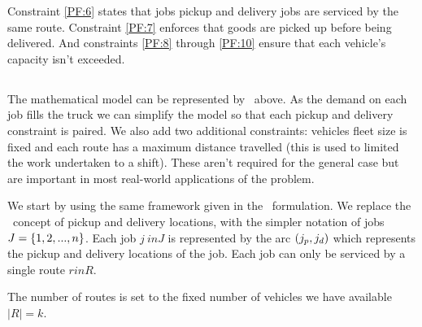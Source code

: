 Constraint \eqref{PF:6} states that jobs pickup and delivery jobs are serviced by the same route. Constraint \eqref{PF:7} enforces that goods are picked up before being delivered. And constraints \eqref{PF:8} through \eqref{PF:10} ensure that each vehicle's capacity isn't exceeded. 

\subsection{\PDPFTL}

The mathematical model can be represented by \PDP\ above. As the demand on each job fills the truck we can simplify the model so that each pickup and delivery constraint is paired. We also add two additional constraints: vehicles fleet size is fixed and each route has a maximum distance travelled (this is used to limited the work undertaken to a shift). These aren't required for the general case but are important in most real-world applications of the problem. 

We start by using the same framework given in the \PDP\ formulation. We replace the \PDP\ concept of pickup and delivery locations, with the simpler notation of jobs $J = \{1,2,...,n\}$. Each job $j \ in J$ is represented by the arc $(j_p,j_d)$ which represents the pickup and delivery locations of the job. Each job can only be serviced by a single route $r in R$.

The number of routes is set to the fixed number of vehicles we have available $|R| = k$.


